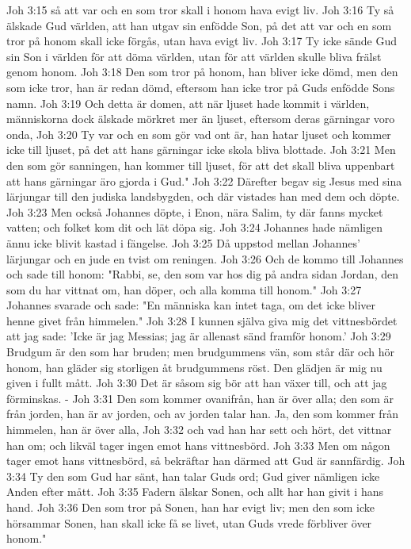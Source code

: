 Joh 3:15  så att var och en som tror skall i honom hava evigt liv.
Joh 3:16  Ty så älskade Gud världen, att han utgav sin enfödde Son, på det att var och en som tror på honom skall icke förgås, utan hava evigt liv.
Joh 3:17  Ty icke sände Gud sin Son i världen för att döma världen, utan för att världen skulle bliva frälst genom honom.
Joh 3:18  Den som tror på honom, han bliver icke dömd, men den som icke tror, han är redan dömd, eftersom han icke tror på Guds enfödde Sons namn.
Joh 3:19  Och detta är domen, att när ljuset hade kommit i världen, människorna dock älskade mörkret mer än ljuset, eftersom deras gärningar voro onda,
Joh 3:20  Ty var och en som gör vad ont är, han hatar ljuset och kommer icke till ljuset, på det att hans gärningar icke skola bliva blottade.
Joh 3:21  Men den som gör sanningen, han kommer till ljuset, för att det skall bliva uppenbart att hans gärningar äro gjorda i Gud."
Joh 3:22  Därefter begav sig Jesus med sina lärjungar till den judiska landsbygden, och där vistades han med dem och döpte.
Joh 3:23  Men också Johannes döpte, i Enon, nära Salim, ty där fanns mycket vatten; och folket kom dit och lät döpa sig.
Joh 3:24  Johannes hade nämligen ännu icke blivit kastad i fängelse.
Joh 3:25  Då uppstod mellan Johannes' lärjungar och en jude en tvist om reningen.
Joh 3:26  Och de kommo till Johannes och sade till honom: "Rabbi, se, den som var hos dig på andra sidan Jordan, den som du har vittnat om, han döper, och alla komma till honom."
Joh 3:27  Johannes svarade och sade: "En människa kan intet taga, om det icke bliver henne givet från himmelen."
Joh 3:28  I kunnen själva giva mig det vittnesbördet att jag sade: 'Icke är jag Messias; jag är allenast sänd framför honom.'
Joh 3:29  Brudgum är den som har bruden; men brudgummens vän, som står där och hör honom, han gläder sig storligen åt brudgummens röst. Den glädjen är mig nu given i fullt mått.
Joh 3:30  Det är såsom sig bör att han växer till, och att jag förminskas. -
Joh 3:31  Den som kommer ovanifrån, han är över alla; den som är från jorden, han är av jorden, och av jorden talar han. Ja, den som kommer från himmelen, han är över alla,
Joh 3:32  och vad han har sett och hört, det vittnar han om; och likväl tager ingen emot hans vittnesbörd.
Joh 3:33  Men om någon tager emot hans vittnesbörd, så bekräftar han därmed att Gud är sannfärdig.
Joh 3:34  Ty den som Gud har sänt, han talar Guds ord; Gud giver nämligen icke Anden efter mått.
Joh 3:35  Fadern älskar Sonen, och allt har han givit i hans hand.
Joh 3:36  Den som tror på Sonen, han har evigt liv; men den som icke hörsammar Sonen, han skall icke få se livet, utan Guds vrede förbliver över honom."
